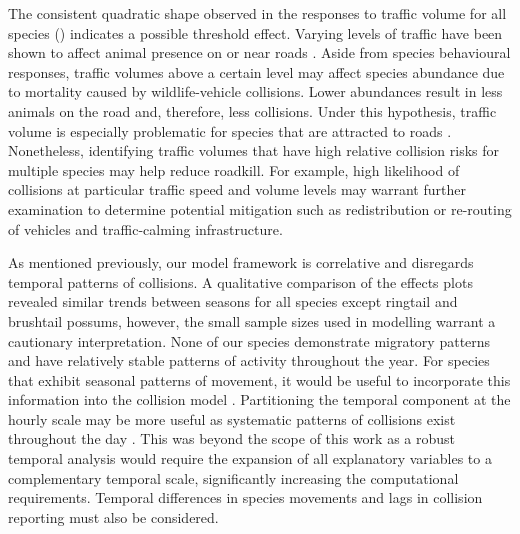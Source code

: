 The consistent quadratic shape observed in the responses to traffic volume for all species () indicates a possible threshold effect.  Varying levels of traffic have been shown to affect animal presence on or near roads \citep{jaeg05,rhod14}. Aside from species behavioural responses, traffic volumes above a certain level may affect species abundance due to mortality caused by wildlife-vehicle collisions. Lower abundances result in less animals on the road and, therefore, less collisions. Under this hypothesis, traffic volume is especially problematic for species that are attracted to roads \citep{form03}. Nonetheless, identifying traffic volumes that have high relative collision risks for multiple species may help reduce roadkill.  For example, high likelihood of collisions at particular traffic speed and volume levels may warrant further examination to determine potential mitigation such as redistribution or re-routing of vehicles and traffic-calming infrastructure.

As mentioned previously, our model framework is correlative and disregards temporal patterns of collisions.  A qualitative comparison of the effects plots revealed similar trends between seasons for all species except ringtail and brushtail possums, however, the small sample sizes used in modelling warrant a cautionary interpretation. None of our species demonstrate migratory patterns and have relatively stable patterns of activity throughout the year. For species that exhibit seasonal patterns of movement, it would be useful to incorporate this information into the collision model \citep[see][]{neum12}. Partitioning the temporal component at the hourly scale may be more useful as systematic patterns of collisions exist throughout the day \citep[e.g.][]{litv08,rhod14}. This was beyond the scope of this work as a robust temporal analysis would require the expansion of all explanatory variables to a complementary temporal scale, significantly increasing the computational requirements.  Temporal differences in species movements and lags in collision reporting must also be considered.

